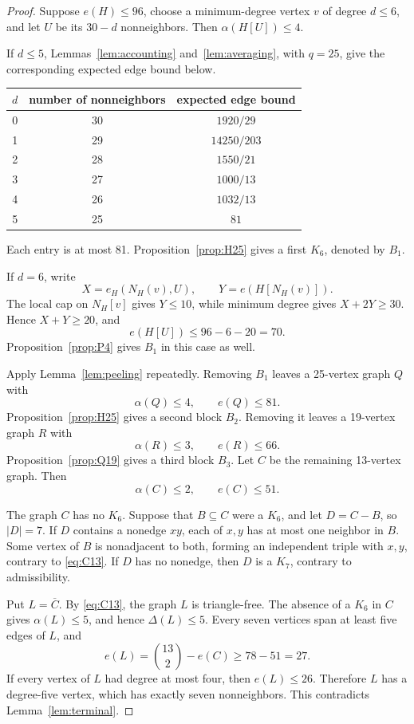\documentclass[11pt,reqno,a4paper]{amsart}
\theoremstyle{definition}
\theoremstyle{remark}
\newcommand{\comp}[1]{\overline{#1}}
\begin{document}
\begin{proof}
Suppose $e(H)\leq96$, choose a minimum-degree vertex $v$ of degree
$d\leq6$, and let $U$ be its $30-d$ nonneighbors.  Then
$\alpha(H[U])\leq4$.

If $d\leq5$, Lemmas~\ref{lem:accounting} and~\ref{lem:averaging}, with
$q=25$, give the corresponding expected edge bound below.
\begin{center}
\begin{tabular}{c@{\qquad}c@{\qquad}c}
\toprule
$d$ & number of nonneighbors & expected edge bound\\
\midrule
0 & 30 & $1920/29$\\
1 & 29 & $14250/203$\\
2 & 28 & $1550/21$\\
3 & 27 & $1000/13$\\
4 & 26 & $1032/13$\\
5 & 25 & $81$\\
\bottomrule
\end{tabular}
\end{center}
Each entry is at most 81.  Proposition~\ref{prop:H25} gives a first
$K_6$, denoted by $B_1$.

If $d=6$, write
\[
  X=e_H(N_H(v),U),\qquad Y=e(H[N_H(v)]).
\]
The local cap on $N_H[v]$ gives $Y\leq10$, while minimum degree gives
$X+2Y\geq30$.  Hence $X+Y\geq20$, and
\[
  e(H[U])\leq96-6-20=70.
\]
Proposition~\ref{prop:P4} gives $B_1$ in this case as well.

Apply Lemma~\ref{lem:peeling} repeatedly.  Removing $B_1$ leaves a
25-vertex graph $Q$ with
\[
  \alpha(Q)\leq4,
  \qquad e(Q)\leq81.
\]
Proposition~\ref{prop:H25} gives a second block $B_2$.  Removing it leaves
a 19-vertex graph $R$ with
\[
  \alpha(R)\leq3,
  \qquad e(R)\leq66.
\]
Proposition~\ref{prop:Q19} gives a third block $B_3$.  Let $C$ be the
remaining 13-vertex graph.  Then
\begin{equation}\label{eq:C13}
  \alpha(C)\leq2,
  \qquad e(C)\leq51.
\end{equation}

The graph $C$ has no $K_6$.  Suppose that $B\subseteq C$ were a $K_6$, and
let $D=C-B$, so $|D|=7$.  If $D$ contains a nonedge $xy$, each of $x,y$
has at most one neighbor in $B$.  Some vertex of $B$ is nonadjacent to both,
forming an independent triple with $x,y$, contrary to \eqref{eq:C13}.  If
$D$ has no nonedge, then $D$ is a $K_7$, contrary to admissibility.

Put $L=\comp C$.  By \eqref{eq:C13}, the graph $L$ is triangle-free.  The
absence of a $K_6$ in $C$ gives $\alpha(L)\leq5$, and hence
$\Delta(L)\leq5$.  Every seven vertices span at least five edges of $L$,
and
\[
  e(L)=\binom{13}{2}-e(C)\geq78-51=27.
\]
If every vertex of $L$ had degree at most four, then $e(L)\leq26$.
Therefore $L$ has a degree-five vertex, which has exactly seven nonneighbors.
This contradicts Lemma~\ref{lem:terminal}.
\end{proof}
\end{document}
